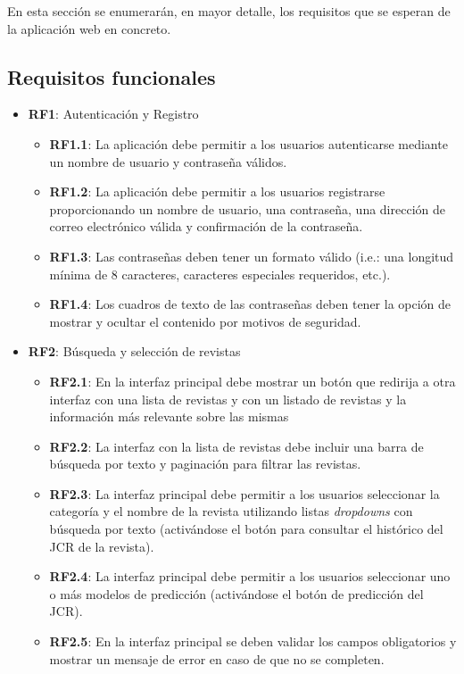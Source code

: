 En esta sección se enumerarán, en mayor detalle, los requisitos que se esperan de la aplicación web en concreto.

\subsection{Requisitos funcionales}

\begin{itemize}
  \item \textbf{RF1}: Autenticación y Registro
  \begin{itemize}
    \item \textbf{RF1.1}: La aplicación debe permitir a los usuarios autenticarse mediante un nombre de usuario y contraseña válidos.
    \item \textbf{RF1.2}: La aplicación debe permitir a los usuarios registrarse proporcionando un nombre de usuario, una contraseña, una dirección de correo electrónico válida y confirmación de la contraseña.
    \item \textbf{RF1.3}: Las contraseñas deben tener un formato válido (i.e.: una longitud mínima de 8 caracteres, caracteres especiales requeridos, etc.).
    \item \textbf{RF1.4}: Los cuadros de texto de las contraseñas deben tener la opción de mostrar y ocultar el contenido por motivos de seguridad.
  \end{itemize}
  
  \item \textbf{RF2}: Búsqueda y selección de revistas
  \begin{itemize}
    \item \textbf{RF2.1}: En la interfaz principal debe mostrar un botón que redirija a otra interfaz con una lista de revistas y con un listado de revistas y la información más relevante sobre las mismas
    \item \textbf{RF2.2}: La interfaz con la lista de revistas debe incluir una barra de búsqueda por texto y paginación para filtrar las revistas.
    \item \textbf{RF2.3}: La interfaz principal debe permitir a los usuarios seleccionar la categoría y el nombre de la revista utilizando listas \textit{dropdowns} con búsqueda por texto (activándose el botón para consultar el histórico del JCR de la revista).
    \item \textbf{RF2.4}: La interfaz principal debe permitir a los usuarios seleccionar uno o más modelos de predicción (activándose el botón de predicción del JCR).
    \item \textbf{RF2.5}: En la interfaz principal se deben validar los campos obligatorios y mostrar un mensaje de error en caso de que no se completen.
  \end{itemize}


\end{itemize}
